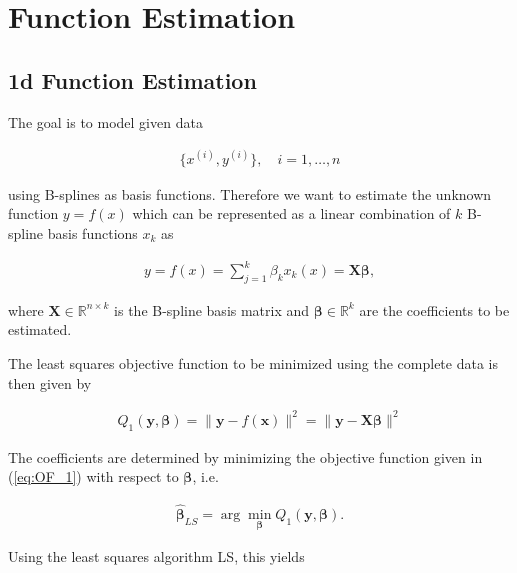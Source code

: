 \documentclass[10pt,a4paper]{article}
\begin{document}
	\section{Function Estimation}
	
	\subsection{1d Function Estimation} \label{1D}
 	 
 	The goal is to model given data
 	
 	\begin{align} \label{eq:data}
 		\{x^{(i)}, y^{(i)}\}, \quad i = 1, \dots, n 
 	\end{align}
 	
	using B-splines as basis functions. Therefore we want to estimate the unknown function $y = f(x)$ which can be represented as a linear combination of $k$ B-spline basis functions $x_k$ as
	
	\begin{align} \label{eq:basis_function_approach}
		y = f(x) = \sum_{j=1}^k \beta_k x_k(x) = \boldsymbol{X} \boldsymbol{\beta},
	\end{align}
	
	where $\boldsymbol{X} \in \mathbb{R}^{n\times k}$ is the B-spline basis matrix and $\boldsymbol{\beta} \in \mathbb{R}^k$ are the coefficients to be estimated. 
	
 	The least squares objective function to be minimized using the complete data is then given by
	
	\begin{align} \label{eq:OF_1}
		Q_1(\boldsymbol{y}, \boldsymbol{\beta}) = \lVert \boldsymbol{y} - f(\boldsymbol{x}) \rVert^2 = \lVert \boldsymbol{y} - \boldsymbol{X}\boldsymbol{\beta} \rVert^2 
	\end{align}	
	
	The coefficients are determined by minimizing the objective function given in (\ref{eq:OF_1}) with respect to $\boldsymbol{\beta}$, i.e.
	
	\begin{align}\label{eq:optimization_problem_1}
		\boldsymbol{\hat \beta}_{LS} = \arg \min_{\boldsymbol{\beta}} Q_1(\boldsymbol{y}, \boldsymbol{\beta}).
	\end{align}
	
	Using the least squares algorithm LS, this yields 
	
\end{document}
